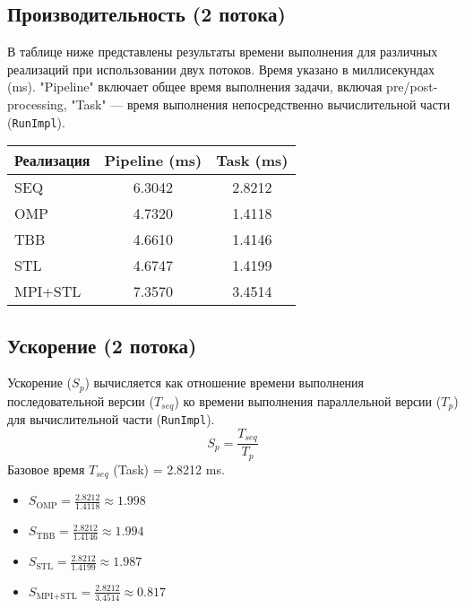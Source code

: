 \documentclass[12pt]{article}
\begin{document}
\subsection*{Производительность (2 потока)}
В таблице ниже представлены результаты времени выполнения для различных реализаций при использовании двух потоков. Время указано в миллисекундах (ms). "Pipeline" включает общее время выполнения задачи, включая pre/post-processing, "Task" — время выполнения непосредственно вычислительной части (\texttt{RunImpl}).

\begin{tabular}{|l|c|c|}
\hline
\textbf{Реализация} & \textbf{Pipeline (ms)} & \textbf{Task (ms)} \\
\hline
SEQ       & 6.3042 & 2.8212 \\
OMP       & 4.7320 & 1.4118 \\
TBB       & 4.6610 & 1.4146 \\
STL       & 4.6747 & 1.4199 \\
MPI+STL   & 7.3570 & 3.4514 \\
\hline
\end{tabular}

\subsection*{Ускорение (2 потока)}
Ускорение ($S_p$) вычисляется как отношение времени выполнения последовательной версии ($T_{seq}$) ко времени выполнения параллельной версии ($T_p$) для вычислительной части (\texttt{RunImpl}).
\[ S_p = \frac{T_{seq}}{T_p} \]
Базовое время $T_{seq}$ (Task) = 2.8212 ms.

\begin{itemize}
    \item $S_{\text{OMP}} = \frac{2.8212}{1.4118} \approx 1.998$
    \item $S_{\text{TBB}} = \frac{2.8212}{1.4146} \approx 1.994$
    \item $S_{\text{STL}} = \frac{2.8212}{1.4199} \approx 1.987$
    \item $S_{\text{MPI+STL}} = \frac{2.8212}{3.4514} \approx 0.817$
\end{itemize}
\end{document}
